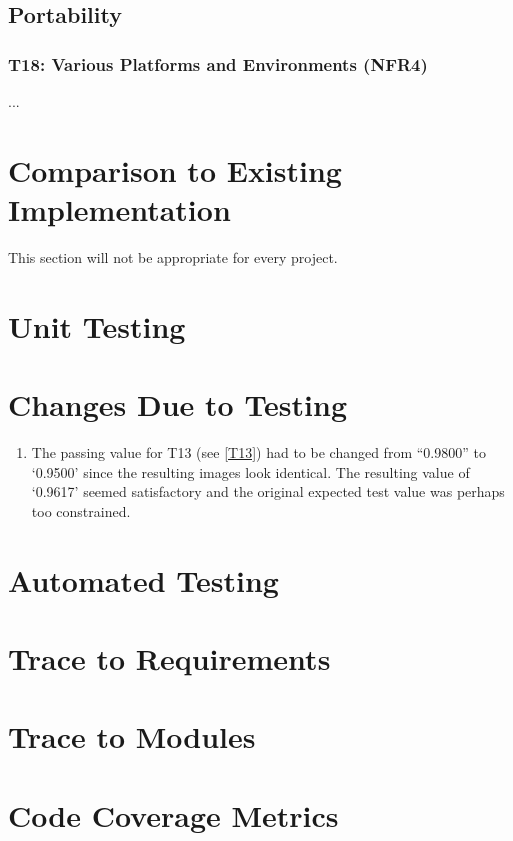 \documentclass[12pt, titlepage]{article}
\begin{document}
\subsection{Portability}
\subsubsection{T18: Various Platforms and Environments (NFR4)}
...
	
\section{Comparison to Existing Implementation}	

This section will not be appropriate for every project.

\section{Unit Testing}

\section{Changes Due to Testing}
\begin{enumerate}
  \item The passing value for T13 (see \ref{T13}) had to be changed from ``0.9800'' to `0.9500' since the
    resulting images look identical. The resulting value of `0.9617' seemed satisfactory and the original
    expected test value was perhaps too constrained.
\end{enumerate}


\section{Automated Testing}
		
\section{Trace to Requirements}
		
\section{Trace to Modules}		

\section{Code Coverage Metrics}
\end{document}
